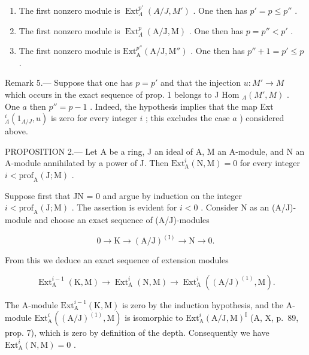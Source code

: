 \begin{enumerate}
\def\labelenumi{\alph{enumi})}
\item
  The first nonzero module is \(\operatorname{Ext}_{\Lambda}^{p'}(A/J, M')\) . One then has \(p' = p \leqslant p''\) .
\item
  The first nonzero module is \(\operatorname{Ext}_{\Lambda}^{p}(\mathrm{A} / \mathrm{J},\mathrm{M})\) . One then has \(p = p'' < p'\) .
\item
  The first nonzero module is \(\mathrm{Ext}_{\mathrm{A}}^{p''}(\mathrm{A} / \mathrm{J},\mathrm{M}'')\) . One then has \(p'' + 1 = p' \leqslant p\) .
\end{enumerate}

Remark 5.--- Suppose that one has \(p = p'\) and that the injection \(u: M' \to M\) which occurs in the exact sequence of prop. 1 belongs to J Hom \(_A(M', M)\) . One \(a\) then \(p'' = p - 1\) . Indeed, the hypothesis implies that the map Ext \(_A^i(1_{A/J}, u)\) is zero for every integer \(i\) ; this excludes the case \(a\) ) considered above.

PROPOSITION 2.--- Let A be a ring, J an ideal of A, M an A-module, and N an A-module annihilated by a power of J. Then \(\mathrm{Ext}_{\mathrm{A}}^{i}(\mathrm{N},\mathrm{M}) = 0\) for every integer \(i < \mathrm{prof}_{\mathrm{A}}(\mathrm{J};\mathrm{M})\) .

Suppose first that JN = 0 and argue by induction on the integer \(i < \mathrm{prof}_{\mathrm{A}}(\mathrm{J};\mathrm{M})\) . The assertion is evident for \(i < 0\) . Consider N as an (A/J)-module and choose an exact sequence of (A/J)-modules

\[
0 \rightarrow \mathrm{K} \longrightarrow (\mathrm{A} / \mathrm{J}) ^ {(\mathrm{I})} \longrightarrow \mathrm{N} \rightarrow 0.
\]

From this we deduce an exact sequence of extension modules

\[
\operatorname{Ext} _ {\mathrm{A}} ^ {i - 1} (\mathrm{K}, \mathrm{M}) \longrightarrow \operatorname{Ext} _ {\mathrm{A}} ^ {i} (\mathrm{N}, \mathrm{M}) \longrightarrow \operatorname{Ext} _ {\mathrm{A}} ^ {i} ((\mathrm{A} / \mathrm{J}) ^ {(1)}, \mathrm{M}).
\]

The A-module \(\mathrm{Ext}_{\mathrm{A}}^{i-1}(\mathrm{K},\mathrm{M})\) is zero by the induction hypothesis, and the A-module \(\mathrm{Ext}_{\mathrm{A}}^{i}((\mathrm{A}/\mathrm{J})^{(1)},\mathrm{M})\) is isomorphic to \(\mathrm{Ext}_{\mathrm{A}}^{i}(\mathrm{A}/\mathrm{J},\mathrm{M})^{\mathrm{I}}\) (A, X, p.~89, prop. 7), which is zero by definition of the depth. Consequently we have \(\mathrm{Ext}_{\mathrm{A}}^{i}(\mathrm{N},\mathrm{M}) = 0\) .

